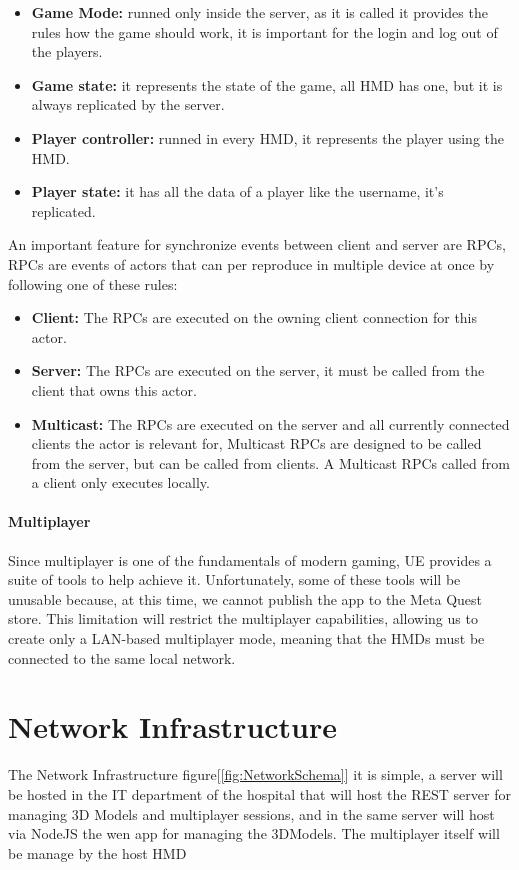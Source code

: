 \begin{itemize}
  \item \textbf{Game Mode:} runned only inside the server, as it is called it provides the rules how the game should work, it is important for the login and log out of the players.
  \item \textbf{Game state:} it represents the state of the game, all \ac{HMD} has one, but it is always replicated by the server.
  \item \textbf{Player controller:} runned in every \ac{HMD}, it represents the player using the \ac{HMD}.
  \item \textbf{Player state:} it has all the data of a player like the username, it's replicated.
\end{itemize}
\noindent
An important feature for synchronize events between client and server are \ac{RPCs}, \ac{RPCs} are events of actors that can per reproduce in multiple device at once by following one of these rules:
\begin{itemize}
  \item \textbf{Client:} The \ac{RPCs} are executed on the owning client connection for this actor.
  \item \textbf{Server:} The \ac{RPCs} are executed on the server, it must be called from the client that owns this actor.
  \item \textbf{Multicast:} The \ac{RPCs} are executed on the server and all currently connected clients the actor is relevant for, Multicast \ac{RPCs} are designed to be called from the server, but can be called from clients. A Multicast \ac{RPCs} called from a client only executes locally.
\end{itemize}

\paragraph{Multiplayer}
Since multiplayer is one of the fundamentals of modern gaming, \ac{UE} provides a suite of tools to help achieve it.
Unfortunately, some of these tools will be unusable because, at this time, we cannot publish the app to the Meta Quest store.
This limitation will restrict the multiplayer capabilities, allowing us to create only a LAN-based multiplayer mode, meaning that the \ac{HMD}s must be connected to the same local network.

\section{Network Infrastructure}
\noindent
The Network Infrastructure figure[\ref{fig:NetworkSchema}] it is simple, a server will be hosted in the IT department of the hospital that will host the \ac{REST} server for managing 3D Models and multiplayer sessions,
and in the same server will host via NodeJS the wen app for managing the 3DModels.
The multiplayer itself will be manage by the host \ac{HMD}

